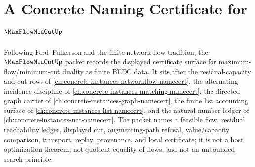 \chapter{A Concrete Naming Certificate for $\MaxFlowMinCutUp$}
\label{ch:concrete-instances-max-flow-min-cut-namecert}

Following Ford--Fulkerson and the finite network-flow tradition, the $\MaxFlowMinCutUp$ packet records the displayed certificate surface for maximum-flow/minimum-cut duality as finite BEDC data. It sits after the residual-capacity and cut rows of \autoref{ch:concrete-instances-networkflow-namecert}, the alternating-incidence discipline of \autoref{ch:concrete-instances-matching-namecert}, the directed graph carrier of \autoref{ch:concrete-instances-graph-namecert}, the finite list accounting surface of \autoref{ch:concrete-instances-list-namecert}, and the natural-number ledger of \autoref{ch:concrete-instances-nat-namecert}. The packet names a feasible flow, residual reachability ledger, displayed cut, augmenting-path refusal, value/capacity comparison, transport, replay, provenance, and local certificate; it is not a host optimization theorem, not quotient equality of flows, and not an unbounded search principle.

